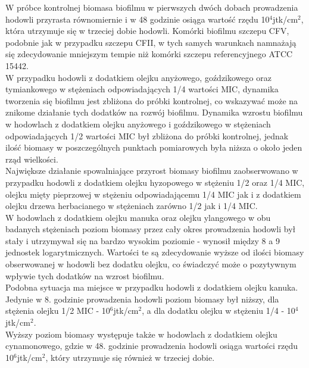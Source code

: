 \documentclass[11pt,a4paper]{report}
\begin{document}
W próbce kontrolnej biomasa biofilmu w pierwszych dwóch dobach prowadzenia hodowli przyrasta równomiernie i w 48 godzinie osiąga wartość rzędu 10$^4$jtk/cm$^2$, która utrzymuje się w trzeciej dobie hodowli. Komórki biofilmu szczepu CFV, podobnie jak w przypadku szczepu CFII, w tych samych warunkach namnażają się zdecydowanie mniejszym tempie niż komórki szczepu referencyjnego ATCC 15442.\\
W przypadku hodowli z dodatkiem olejku anyżowego, goździkowego oraz tymiankowego w stężeniach odpowiadających 1/4 wartości MIC, dynamika tworzenia się biofilmu jest zbliżona do próbki kontrolnej, co wskazywać może na znikome działanie tych dodatków na rozwój biofilmu.
Dynamika wzrostu biofilmu w hodowlach z dodatkiem olejku anyżowego i goździkowego w stężeniach odpowiadających 1/2 wartości MIC był zbliżona do próbki kontrolnej, jednak ilość biomasy w poszczególnych punktach pomiarowych była niższa o około jeden rząd wielkości.\\
Największe działanie spowalniające przyrost biomasy biofilmu zaobserwowano w przypadku hodowli z dodatkiem olejku hyzopowego w stężeniu 1/2 oraz 1/4 MIC, olejku mięty pieprzowej w stężeniu odpowiadającemu 1/4 MIC jak i z dodatkiem olejku drzewa herbacianego w stężeniach zarówno 1/2 jak i 1/4 MIC.\\
W hodowlach z dodatkiem olejku manuka oraz olejku ylangowego w obu badanych stężeniach poziom biomasy przez cały okres prowadzenia hodowli był stały i utrzymywał się na bardzo wysokim poziomie - wynosił między 8 a 9 jednostek logarytmicznych. Wartości te są zdecydowanie wyższe od ilości biomasy obserwowanej w hodowli bez dodatku olejku, co świadczyć może o pozytywnym wpływie tych dodatków na wzrost biofilmu.\\
Podobna sytuacja ma miejsce w przypadku hodowli z dodatkiem olejku kanuka. Jedynie w 8. godzinie prowadzenia hodowli poziom biomasy był niższy, dla stężenia olejku 1/2 MIC - 10$^6$jtk/cm$^2$, a dla dodatku olejku w stężeniu 1/4 - 10$^4$jtk/cm$^2$.\\
Wyższy poziom biomasy występuje także w hodowlach z dodatkiem olejku cynamonowego, gdzie w 48. godzinie prowadzenia hodowli osiąga wartości rzędu 10$^6$jtk/cm$^2$, który utrzymuje się również w trzeciej dobie.
\end{document}
